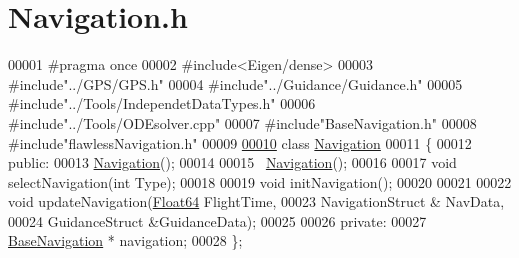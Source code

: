 \hypertarget{_navigation_8h_source}{}\section{Navigation.\+h}
\label{_navigation_8h_source}

\begin{DoxyCode}
00001 \textcolor{preprocessor}{#pragma once}
00002 \textcolor{preprocessor}{#include<Eigen/dense>}
00003 \textcolor{preprocessor}{#include"../GPS/GPS.h"}
00004 \textcolor{preprocessor}{#include"../Guidance/Guidance.h"}
00005 \textcolor{preprocessor}{#include"../Tools/IndependetDataTypes.h"}
00006 \textcolor{preprocessor}{#include"../Tools/ODEsolver.cpp"}
00007 \textcolor{preprocessor}{#include"BaseNavigation.h"}
00008 \textcolor{preprocessor}{#include"flawlessNavigation.h"}
00009 
\hyperlink{class_navigation}{00010} \textcolor{keyword}{class }\hyperlink{class_navigation}{Navigation}
00011 \{
00012 \textcolor{keyword}{public}:
00013     \hyperlink{class_navigation}{Navigation}();
00014 
00015     ~\hyperlink{class_navigation}{Navigation}();
00016 
00017     \textcolor{keywordtype}{void} selectNavigation(\textcolor{keywordtype}{int} Type);
00018 
00019     \textcolor{keywordtype}{void} initNavigation();
00020 
00021 
00022     \textcolor{keywordtype}{void} updateNavigation(\hyperlink{group___tools_ga3f1431cb9f76da10f59246d1d743dc2c}{Float64} FlightTime,
00023                         NavigationStruct & NavData,
00024                         GuidanceStruct &GuidanceData);
00025 
00026 \textcolor{keyword}{private}:
00027     \hyperlink{class_base_navigation}{BaseNavigation} * navigation;
00028 \};
\end{DoxyCode}
